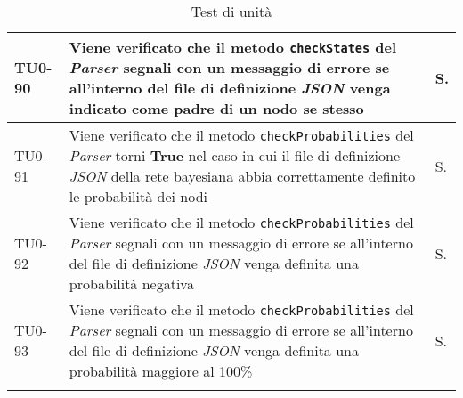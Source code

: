 \begin{longtable}{|C{.15\textwidth}|m{.65\textwidth}|C{.20\textwidth}|}
\hline
{}TU0-90 & Viene verificato che il metodo \texttt{checkStates} del \textit{Parser} segnali con un messaggio di errore se all'interno del file di definizione \textit{JSON} venga indicato come padre di un nodo se stesso & S.\\
\hline
TU0-91 & Viene verificato che il metodo \texttt{checkProbabilities} del \textit{Parser} torni \textbf{True} nel caso in cui il file di definizione \textit{JSON} della rete bayesiana abbia correttamente definito le probabilità dei nodi & S.\\
\hline
{}TU0-92 & Viene verificato che il metodo \texttt{checkProbabilities} del \textit{Parser} segnali con un messaggio di errore se all'interno del file di definizione \textit{JSON} venga definita una probabilità negativa & S.\\
\hline
TU0-93 & Viene verificato che il metodo \texttt{checkProbabilities} del \textit{Parser} segnali con un messaggio di errore se all'interno del file di definizione \textit{JSON} venga definita una probabilità maggiore al 100\% & S.\\
\hline
\caption{Test di unità}
\label{testunita}
\end{longtable}




























